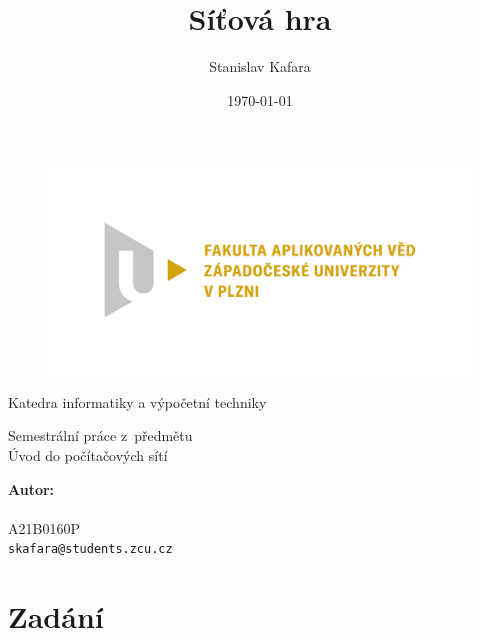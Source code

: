 \documentclass[a4paper, 12pt]{report}
\title{Síťová hra \uv{Lodě}}
\author{Stanislav Kafara}
\date{\today}
\begin{document}
\begin{titlepage}

\begin{center}

\begin{figure}
\centering
\includegraphics[width=.75\textwidth]{FAV_logo}
\end{figure}

Katedra informatiky a výpočetní techniky

\vspace{5\baselineskip}

Semestrální práce z~předmětu\\
Úvod do počítačových sítí

\vspace{2\baselineskip}

{\makeatletter
\LARGE \bfseries \@title
\makeatother}

\end{center}

\vfill

\begin{flushleft}

\textbf{Autor:}\\
{\makeatletter
\@author
\makeatother}\\
A21B0160P\\
\texttt{skafara@students.zcu.cz}

\end{flushleft}

\end{titlepage}

\begin{tableofcontents}

\end{tableofcontents}

\chapter{Zadání}
\end{document}
